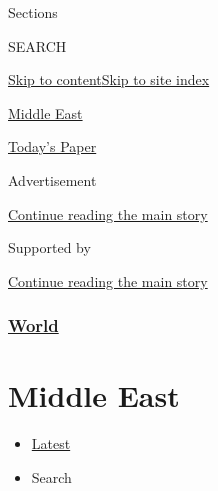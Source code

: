 Sections

SEARCH

\protect\hyperlink{site-content}{Skip to
content}\protect\hyperlink{site-index}{Skip to site index}

\href{https://www.nytimes.com/section/world/middleeast}{Middle East}

\href{https://myaccount.nytimes.com/auth/login?response_type=cookie\&client_id=vi}{}

\href{https://www.nytimes.com/section/todayspaper}{Today's Paper}

Advertisement

\protect\hyperlink{after-top}{Continue reading the main story}

Supported by

\protect\hyperlink{after-sponsor}{Continue reading the main story}

\hypertarget{world}{%
\subsubsection{\texorpdfstring{\href{/section/world}{World}}{World}}\label{world}}

\hypertarget{middle-east}{%
\section{Middle East}\label{middle-east}}

\begin{itemize}
\tightlist
\item
  \protect\hyperlink{stream-panel}{Latest}
\item
  Search
\end{itemize}

